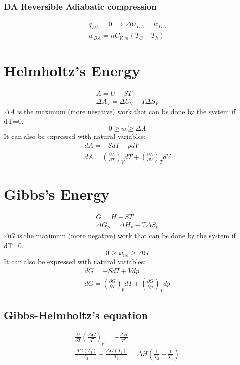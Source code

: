 \documentclass[a4paper]{report}
\begin{document}
\begin{multicols}{2}
        \subsubsection{DA Reversible Adiabatic compression}
        \begin{gather*}
          q_{DA} = 0 \implies \Delta U_{DA} = w_{DA}\\
          w_{DA} = nC_{V,m}(T_{C}-T_{h})  
        \end{gather*}

    \section{Helmholtz's Energy}
    \begin{gather*}
      A = U - ST \\
      \Delta A_{V}  = \Delta U_{V}  - T \Delta S_{V}  
    \end{gather*}
    $\Delta A$ is the maximum (more negative) work that can be done by the system if dT=0.
    $$ 0 \geq w \geq \Delta A $$
    It can also be expressed with natural variables:
    \begin{gather*}
      dA = -SdT - pdV \\
      dA = \left(\frac{\partial A}{\partial T}\right)_{V}  dT + \left(\frac{\partial A}{\partial V}\right) _{T}dV  
    \end{gather*}

    \section{Gibbs's Energy}
      \begin{gather*}
        G = H - ST\\
        \Delta G_{p}  = \Delta H_{p}  - T\Delta S_{p}  
      \end{gather*}
    $\Delta G$ is the maximum (more negative) work that can be done by the system if dT=0.
    \[
      0 \geq w_{ne} \geq \Delta G
    \] 
    It can also be expressed with natural variables:
    \begin{gather*}
      dG = -SdT + Vdp\\
      dG = \left( \frac{\partial G}{\partial T}  \right)_{p}dT + \left( \frac{\partial G}{\partial p}  \right)_{T}dp  
    \end{gather*}
    \subsection{Gibbs-Helmholtz's equation}
    \begin{gather*}
      \frac{\partial }{\partial T} \left( \frac{\Delta G}{T} \right) _{p} = -\frac{\Delta H}{T^{2} }\\
      \frac{\Delta G(T_2)}{T_2} - \frac{\Delta G(T_1)}{T_{1} } = \Delta H \left( \frac{1}{T_2}-\frac{1}{T_1} \right) 
    \end{gather*} 

\end{multicols}
\end{document}
